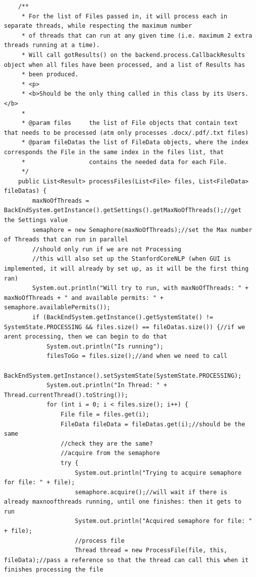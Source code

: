 \begin{lstlisting}
    /**
     * For the list of Files passed in, it will process each in separate threads, while respecting the maximum number
     * of threads that can run at any given time (i.e. maximum 2 extra threads running at a time).
     * Will call gotResults() on the backend.process.CallbackResults object when all files have been processed, and a list of Results has
     * been produced.
     * <p>
     * <b>Should be the only thing called in this class by its Users.</b>
     *
     * @param files     the list of File objects that contain text that needs to be processed (atm only processes .docx/.pdf/.txt files)
     * @param fileDatas the list of FileData objects, where the index corresponds the File in the same index in the files list, that
     *                  contains the needed data for each File.
     */
    public List<Result> processFiles(List<File> files, List<FileData> fileDatas) {
        maxNoOfThreads = BackEndSystem.getInstance().getSettings().getMaxNoOfThreads();//get the Settings value
        semaphore = new Semaphore(maxNoOfThreads);//set the Max number of Threads that can run in parallel
        //should only run if we are not Processing
        //this will also set up the StanfordCoreNLP (when GUI is implemented, it will already by set up, as it will be the first thing ran)
        System.out.println("Will try to run, with maxNoOfThreads: " + maxNoOfThreads + " and available permits: " + semaphore.availablePermits());
        if (BackEndSystem.getInstance().getSystemState() != SystemState.PROCESSING && files.size() == fileDatas.size()) {//if we arent processing, then we can begin to do that
            System.out.println("Is running");
            filesToGo = files.size();//and when we need to call
            BackEndSystem.getInstance().setSystemState(SystemState.PROCESSING);
            System.out.println("In Thread: " + Thread.currentThread().toString());
            for (int i = 0; i < files.size(); i++) {
                File file = files.get(i);
                FileData fileData = fileDatas.get(i);//should be the same
                //check they are the same?
                //acquire from the semaphore
                try {
                    System.out.println("Trying to acquire semaphore for file: " + file);
                    semaphore.acquire();//will wait if there is already maxnoofthreads running, until one finishes: then it gets to run
                    System.out.println("Acquired semaphore for file: " + file);
                    //process file
                    Thread thread = new ProcessFile(file, this, fileData);//pass a reference so that the thread can call this when it finishes processing the file

\end{lstlisting}
